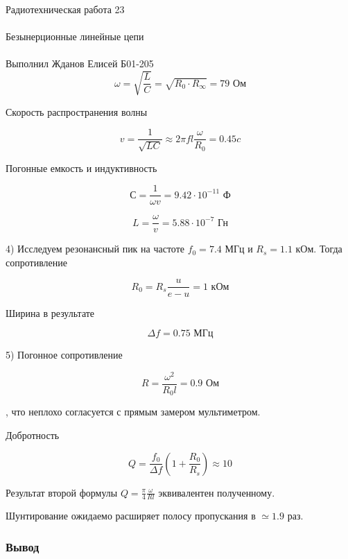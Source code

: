 \documentclass{astroedu-lab}
\begin{document}
\begin{problem}{\huge Радиотехническая работа 23\\\\Безынерционные линейные цепи\\\\Выполнил Жданов Елисей Б01-205}
\begin{equation}
	\omega = \sqrt{\frac{L}{C}} = \sqrt{R_0 \cdot R_{\infty}} = 79 \text{ Ом}
\end{equation}

Скорость распространения волны

\begin{equation}
	v = \frac{1}{\sqrt{L C}} \approx 2 \pi f l \frac{\omega}{R_0} = 0.45 c
\end{equation}

Погонные емкость и индуктивность

\begin{equation}
	С = \frac{1}{\omega v} = 9.42 \cdot 10^{-11} \text{ Ф}
\end{equation}

\begin{equation}
	L = \frac{\omega}{v} = 5.88 \cdot 10^{-7} \text{ Гн}
\end{equation}

4) Исследуем резонансный пик на частоте $f_0 = 7.4$ МГц и $R_s = 1.1$ кОм. Тогда сопротивление

\begin{equation}
	R_0 = R_s \frac{u}{e - u} = 1 \text{ кОм}
\end{equation}

Ширина в результате

\begin{equation}
	\Delta f = 0.75 \text{ МГц}
\end{equation}

5) Погонное сопротивление

\begin{equation}
	R = \frac{\omega^2}{R_0 l} = 0.9 \text{ Ом}
\end{equation}

, что неплохо согласуется с прямым замером мультиметром.

Добротность

\begin{equation}
	Q = \frac{f_0}{\Delta f} \left( 1 + \frac{R_0}{R_s} \right) \approx 10
\end{equation}

Результат второй формулы $Q = \frac{\pi}{4}\frac{\omega}{R l}$ эквивалентен полученному.

Шунтирование ожидаемо расширяет полосу пропускания в $\simeq 1.9$ раз.

\subsubsection{Вывод}


\end{problem}
\end{document}
